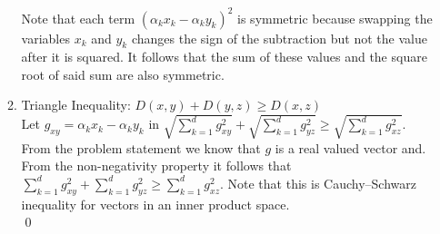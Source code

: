 \documentclass[12pt]{article}
\begin{document}
\begin{enumerate}
\begin{enumerate}
Note that each term $(\alpha_k x_k-\alpha_k y_k)^2$ is symmetric because swapping the variables $x_k$ and $y_k$ changes the sign of the subtraction but not the value after it is squared. It follows that the sum of these values and the square root of said sum are also symmetric.
\item Triangle Inequality: $ D(x,y) + D(y,z) \geq D(x,z) $ \\
Let $g_{xy} = \alpha_k x_k-\alpha_k y_k$ in $\sqrt{\sum_{k=1}^dg_{xy}^2} + \sqrt{\sum_{k=1}^dg_{yz}^2} \geq \sqrt{\sum_{k=1}^dg_{xz}^2}$. From the problem statement we know that $g$ is a real valued vector and. From the non-negativity property it follows that $\sum_{k=1}^dg_{xy}^2 + \sum_{k=1}^dg_{yz}^2 \geq \sum_{k=1}^dg_{xz}^2$. Note that this is Cauchy–Schwarz inequality for vectors in an inner product space.\\
\qed
\end{enumerate}
\end{enumerate}
\end{document}
